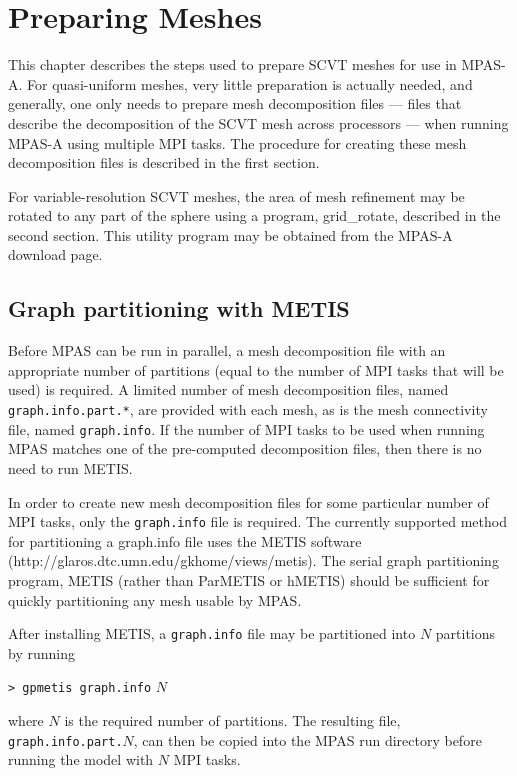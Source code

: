 \chapter{Preparing Meshes}
\label{chap:mpas_grid_preparation}

This chapter describes the steps used to prepare SCVT meshes for use in MPAS-A.
For quasi-uniform meshes, very little preparation is actually needed, and
generally, one only needs to prepare mesh decomposition files --- files that
describe the decomposition of the SCVT mesh across processors --- when running
MPAS-A using multiple MPI tasks. The procedure for creating these mesh
decomposition files is described in the first section. 

For variable-resolution SCVT meshes, the area of mesh refinement may be rotated
to any part of the sphere using a program, grid\_rotate, described in the second
section. This utility program may be obtained from the MPAS-A download page.
\section{Graph partitioning with METIS} 
\label{sec:metis}

Before MPAS can be run in parallel, a mesh decomposition file with an
appropriate number of partitions (equal to the number of MPI tasks that will be
used) is required. A limited number of mesh decomposition files, named {\tt
graph.info.part.*}, are provided with each mesh, as is the mesh
connectivity file, named {\tt graph.info}. If the number of MPI tasks to be used when
running MPAS matches one of the pre-computed decomposition files, then there
is no need to run METIS.

In order to create new mesh decomposition files for some particular number of MPI tasks, 
only the {\tt graph.info} file is required.  The currently supported method for partitioning
a graph.info file uses the METIS software
(http://glaros.dtc.umn.edu/gkhome/views/metis).  The serial graph partitioning
program, METIS (rather than ParMETIS or hMETIS) should be sufficient for
quickly partitioning any mesh usable by MPAS.

After installing METIS, a {\tt graph.info} file may be partitioned into $N$
partitions by running

\vspace{12pt}
{\tt > gpmetis graph.info} $N$
\vspace{12pt}

\noindent where $N$ is the required number of partitions. The resulting file, {\tt graph.info.part.}$N$, 
can then be copied into the MPAS run directory before running the model with $N$ MPI tasks.


